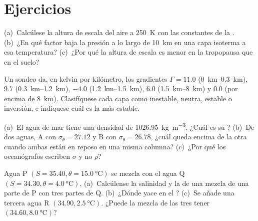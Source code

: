 \section{Ejercicios}

\begin{exercise}[$\star$]\label{exo:b1:fluid-envelopes-structure:1}
(a)~Calcúlese la altura de escala del aire a \qty{250}{K} con las constantes de la . (b)~¿En qué factor baja la presión a lo largo de \qty{10}{km} en una capa isoterma a esa temperatura? (c)~¿Por qué la altura de escala es menor en la tropopausa que en el suelo?
\end{exercise}

\begin{exercise}[$\star$]\label{exo:b1:fluid-envelopes-structure:2}
Un sondeo da, en kelvin por kilómetro, los gradientes $\Gamma = 11.0$
(\qtyrange{0}{0.3}{km}), $9.7$ (\qtyrange{0.3}{1.2}{km}), $-4.0$
(\qtyrange{1.2}{1.5}{km}), $6.0$ (\qtyrange{1.5}{8}{km}) y $0.0$ (por encima de
\qty{8}{km}). Clasifíquese cada capa como inestable, neutra, estable o inversión, e indíquese cuál es la más estable.
\end{exercise}

\begin{exercise}[$\star$]\label{exo:b1:fluid-envelopes-structure:3}
(a)~El agua de mar tiene una densidad de \qty{1026.95}{kg.m^{-3}}. ¿Cuál es su ? (b)~De dos aguas, A con $\sigma_\theta = 27.12$ y B con
$\sigma_\theta = 26.78$, ¿cuál queda encima de la otra cuando ambas están en reposo en una misma columna? (c)~¿Por qué los oceanógrafos escriben $\sigma$ y no $\rho$?
\end{exercise}

\begin{exercise}[$\star$]\label{exo:b1:fluid-envelopes-structure:4}
Agua P $(S = 35.40, \theta = \qty{15.0}{\celsius})$ se mezcla con el agua Q $(S =
34.30, \theta = \qty{4.0}{\celsius})$. (a)~Calcúlense la salinidad y la  de una mezcla de una parte de P con tres partes de Q.
(b)~¿Dónde yace en el ? (c)~Se añade una tercera agua R $(34.90,
\qty{2.5}{\celsius})$. ¿Puede la mezcla de las tres tener $(34.60, \qty{8.0}{\celsius})$?
\end{exercise}

